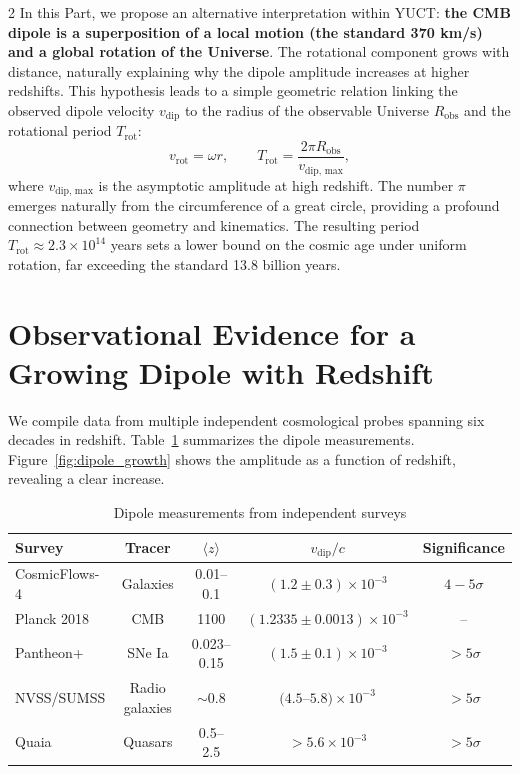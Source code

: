 \documentclass[12pt,a4paper]{article}
\begin{document}
\begin{multicols}{2}
		In this Part, we propose an alternative interpretation within YUCT: \textbf{the CMB dipole is a superposition of a local motion (the standard 370 km/s) and a global rotation of the Universe}. The rotational component grows with distance, naturally explaining why the dipole amplitude increases at higher redshifts. This hypothesis leads to a simple geometric relation linking the observed dipole velocity \(v_{\text{dip}}\) to the radius of the observable Universe \(R_{\text{obs}}\) and the rotational period \(T_{\text{rot}}\):
		\begin{equation}
			v_{\text{rot}} = \omega r, \qquad T_{\text{rot}} = \frac{2\pi R_{\text{obs}}}{v_{\text{dip, max}}},
		\end{equation}
		where \(v_{\text{dip, max}}\) is the asymptotic amplitude at high redshift. The number \(\pi\) emerges naturally from the circumference of a great circle, providing a profound connection between geometry and kinematics. The resulting period \(T_{\text{rot}} \approx 2.3 \times 10^{14}\) years sets a lower bound on the cosmic age under uniform rotation, far exceeding the standard 13.8 billion years.
		
		\section{Observational Evidence for a Growing Dipole with Redshift}
		
		We compile data from multiple independent cosmological probes spanning six decades in redshift. Table~\ref{tab:dipoles} summarizes the dipole measurements. Figure~\ref{fig:dipole_growth} shows the amplitude as a function of redshift, revealing a clear increase.
		
	\end{multicols}
	
	\begin{table}[htbp]
		\centering
		\caption{Dipole measurements from independent surveys}
		\label{tab:dipoles}
		\begin{tabular}{lcccc}
			\toprule
			\textbf{Survey} & \textbf{Tracer} & \(\langle z \rangle\) & \(v_{\text{dip}}/c\) & \textbf{Significance} \\
			\midrule
			CosmicFlows-4 \cite{Watkins2023} & Galaxies & 0.01--0.1 & \((1.2 \pm 0.3) \times 10^{-3}\) & \(4-5\sigma\) \\
			Planck 2018 \cite{Planck2018VII} & CMB & 1100 & \((1.2335 \pm 0.0013) \times 10^{-3}\) & -- \\
			Pantheon+ \cite{Sah2025} & SNe Ia & 0.023--0.15 & \((1.5 \pm 0.1) \times 10^{-3}\) & \(>5\sigma\) \\
			NVSS/SUMSS \cite{Colin2017} & Radio galaxies & \(\sim0.8\) & \((4.5\)--\(5.8) \times 10^{-3}\) & \(>5\sigma\) \\
			Quaia \cite{Secrest2025} & Quasars & 0.5--2.5 & \(>5.6 \times 10^{-3}\) & \(>5\sigma\) \\
			\bottomrule
		\end{tabular}
	\end{table}
	
\end{document}
